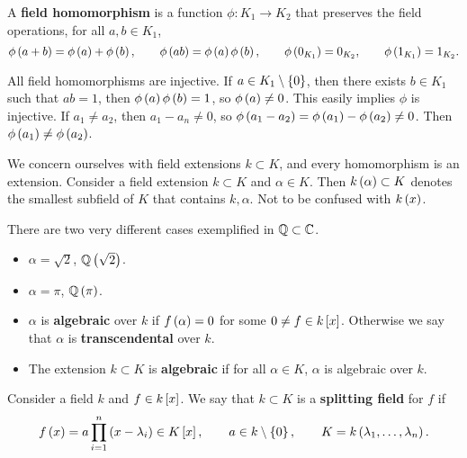 
\begin{definition}
A \textbf{field homomorphism} is a function $ \phi : K_1 \to K_2 $ that preserves the field operations, for all $ a, b \in K_1 $,
$$ \phi\rb{a + b} = \phi\rb{a} + \phi\rb{b}, \qquad \phi\rb{ab} = \phi\rb{a}\phi\rb{b}, \qquad \phi\rb{0_{K_1}} = 0_{K_2}, \qquad \phi\rb{1_{K_1}} = 1_{K_2}. $$
\end{definition}

\begin{remark1}
All field homomorphisms are injective. If $ a \in K_1 \setminus \cb{0} $, then there exists $ b \in K_1 $ such that $ ab = 1 $, then $ \phi\rb{a}\phi\rb{b} = 1 $, so $ \phi\rb{a} \ne 0 $. This easily implies $ \phi $ is injective. If $ a_1 \ne a_2 $, then $ a_1 - a_n \ne 0 $, so $ \phi\rb{a_1 - a_2} = \phi\rb{a_1} - \phi\rb{a_2} \ne 0 $. Then $ \phi\rb{a_1} \ne \phi\rb{a_2} $.
\end{remark1}

We concern ourselves with field extensions $ k \subset K $, and every homomorphism is an extension. Consider a field extension $ k \subset K $ and $ \alpha \in K $. Then $ k\rb{\alpha} \subset K $ denotes the smallest subfield of $ K $ that contains $ k, \alpha $. Not to be confused with $ k\rb{x} $.

\begin{example1}
There are two very different cases exemplified in $ \Q \subset \C $.
\begin{itemize}
\item $ \alpha = \sqrt{2} $, $ \Q\rb{\sqrt{2}} $.
\item $ \alpha = \pi $, $ \Q\rb{\pi} $.
\end{itemize}
\end{example1}

\begin{definition}
\hfill
\begin{itemize}
\item $ \alpha $ is \textbf{algebraic} over $ k $ if $ f\rb{\alpha} = 0 $ for some $ 0 \ne f \in k\sb{x} $. Otherwise we say that $ \alpha $ is \textbf{transcendental} over $ k $.
\item The extension $ k \subset K $ is \textbf{algebraic} if for all $ \alpha \in K $, $ \alpha $ is algebraic over $ k $.
\end{itemize}
\end{definition}

\begin{definition}
Consider a field $ k $ and $ f \in k\sb{x} $. We say that $ k \subset K $ is a \textbf{splitting field} for $ f $ if
$$ f\rb{x} = a\prod_{i = 1}^n \rb{x - \lambda_i} \in K\sb{x}, \qquad a \in k \setminus \cb{0}, \qquad K = k\rb{\lambda_1, \dots, \lambda_n}. $$
\end{definition}

